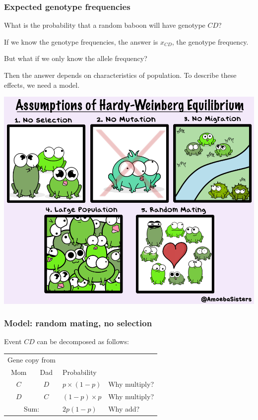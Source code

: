 \documentclass[12pt]{beamer}
\begin{document}
\begin{frame}
\frametitle{Expected genotype frequencies}

What is the probability that a random baboon will have genotype $CD$?

\bigskip
\pause

If we know the genotype frequencies, the answer is $x_{CD}$, the
genotype frequency.

\bigskip
But what if we only know the allele frequency?

\bigskip
\pause

Then the answer depends on characteristics of population.  \pause To
describe these effects, we need a model.
\end{frame}

\begin{frame}
\includegraphics[width=\linewidth]{hwequil.png}
\end{frame}

\begin{frame}
\frametitle{Model: random mating, no selection}

Event $CD$ can be decomposed as follows:
\begin{center}
\begin{tabular}{ccll}
\multicolumn{2}{c}{Gene copy from}\\ \cline{1-2}
Mom  & Dad & Probability\\
\cline{1-3}
$C$  & $D$ & $p \times (1-p)$ & \hspace{2em}Why multiply?\\
$D$  & $C$ & $(1-p) \times p$ & \hspace{2em}Why multiply?\\
\cline{1-3}
\multicolumn{2}{c}{Sum:} & $2p(1-p)$ & \hspace{2em}Why add?
\end{tabular}
\end{center}
\end{frame}
\end{document}
